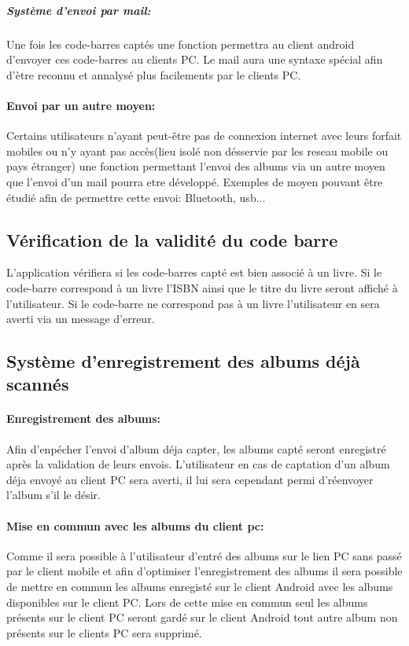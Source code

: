 \begin{description}
\subparagraph{Système d'envoi par mail:}
Une fois les code-barres captés une fonction permettra au client android d'envoyer ces code-barres au clients PC. 
Le mail aura une syntaxe spécial afin d'ètre reconnu et annalysé plus facilements par le clients PC. 

\paragraph{Envoi par un autre moyen:}
Certains utilisateurs n'ayant peut-être pas de connexion internet avec leurs forfait mobiles ou n'y ayant pas accès(lieu isolé non désservie par les reseau mobile ou pays étranger) une fonction permettant l'envoi des albums via un autre moyen que l'envoi d'un mail pourra etre développé.
Exemples de moyen pouvant être étudié afin de permettre cette envoi: Bluetooth, usb...

\subsection{Vérification de la validité du code barre}
L'application vérifiera si les code-barres capté est bien associé à un livre.
Si le code-barre correspond à un livre l'ISBN ainsi que le titre du livre seront affiché à l'utilisateur.
Si le code-barre ne correspond pas à un livre l'utilisateur en sera averti via un message d'erreur.

\subsection{Système d'enregistrement des albums déjà scannés}
\paragraph{Enregistrement des albums:} 
Afin d'enpécher l'envoi d'album déja capter, les albums capté seront enregistré après la validation de leurs envois. 
L'utilisateur en cas de captation d'un album déja envoyé au client PC sera averti, il lui sera cependant permi d'réenvoyer l'album s'il le désir.

\paragraph{Mise en commun avec les albums du client pc:} 
Comme il sera possible à l'utilisateur d'entré des albums sur le lien PC sans passé par le client mobile et afin d'optimiser l'enregistrement des albums il sera possible de mettre en commun les albums enregisté sur le client Android avec les albums disponibles sur le client PC.
Lors de cette mise en commun seul les albums présents sur le client PC seront gardé sur le client Android tout autre album non présents sur le clients PC sera supprimé.  
\end{description}
